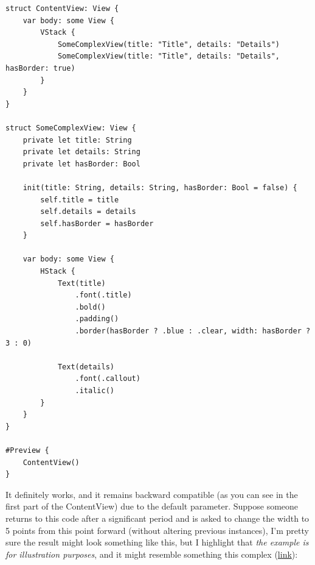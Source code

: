 \documentclass{article}
\begin{document}
\begin{lstlisting}
struct ContentView: View {
    var body: some View {
        VStack {
            SomeComplexView(title: "Title", details: "Details")
            SomeComplexView(title: "Title", details: "Details", hasBorder: true)
        }
    }
}

struct SomeComplexView: View {
    private let title: String
    private let details: String
    private let hasBorder: Bool

    init(title: String, details: String, hasBorder: Bool = false) {
        self.title = title
        self.details = details
        self.hasBorder = hasBorder
    }

    var body: some View {
        HStack {
            Text(title)
                .font(.title)
                .bold()
                .padding()
                .border(hasBorder ? .blue : .clear, width: hasBorder ? 3 : 0)

            Text(details)
                .font(.callout)
                .italic()
        }
    }
}

#Preview {
    ContentView()
}
\end{lstlisting}

It definitely works, and it remains backward compatible (as you can see in the first part of the ContentView) due to the default parameter. Suppose someone returns to this code after a significant period and is asked to change the width to 5 points from this point forward (without altering previous instances), I’m pretty sure the result might look something like this, but I highlight that \emph{the example is for illustration purposes}, and it might resemble something this complex (\href{https://github.com/stateman92/Medium-ViewModifier/commit/51bc0b7be5d6c44ab74f6e06aa44836ccfe44643}{link}):
\end{document}
